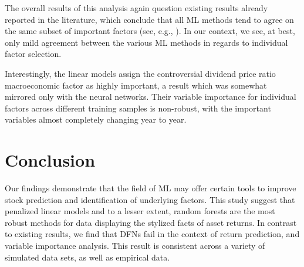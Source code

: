 \documentclass{article}
\begin{document}
The overall results of this analysis again question existing results already reported in the literature, which conclude that all ML methods tend to agree on the same subset of important factors (see, e.g., \cite{gu_empirical_2019}). In our context, we see, at best, only mild agreement between the various ML methods in regards to individual factor selection.

Interestingly, the linear models assign the controversial dividend price ratio macroeconomic factor as highly important, a result which was somewhat mirrored only with the neural networks. Their variable importance for individual factors across different training samples is non-robust, with the important variables almost completely changing year to year. 


\section{Conclusion}

Our findings demonstrate that the field of ML may offer certain tools to improve stock prediction and identification of underlying factors. This study suggest that penalized linear models and to a lesser extent, random forests are the most robust methods for data displaying the stylized facts of asset returns. In contrast to existing results, we find that DFNs fail in the context of return prediction, and variable importance analysis. This result is consistent across a variety of simulated data sets, as well as empirical data. 

\end{document}
